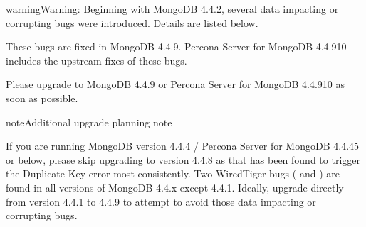 \documentclass[letterpaper,10pt,english]{sphinxmanual}
\begin{document}
\begin{sphinxadmonition}{warning}{Warning:}
\sphinxAtStartPar
Beginning with MongoDB 4.4.2, several data impacting or corrupting bugs were introduced. Details are listed below.

\sphinxAtStartPar
These bugs are fixed in MongoDB 4.4.9. Percona Server for MongoDB 4.4.9\sphinxhyphen{}10 includes the upstream fixes of these bugs.

\sphinxAtStartPar
Please upgrade to MongoDB 4.4.9 or Percona Server for MongoDB 4.4.9\sphinxhyphen{}10  as soon as possible.

\begin{sphinxadmonition}{note}{Additional upgrade planning note}

\sphinxAtStartPar
If you are running MongoDB version 4.4.4 / Percona Server for MongoDB 4.4.4\sphinxhyphen{}5 or below, please skip upgrading to version 4.4.8 as that has been found to trigger the Duplicate Key error most consistently. Two WiredTiger bugs ( and ) are found in all versions of MongoDB 4.4.x except 4.4.1. Ideally, upgrade directly from version 4.4.1 to 4.4.9 to attempt to avoid those data impacting or corrupting bugs.
\end{sphinxadmonition}
\end{sphinxadmonition}
\end{document}
